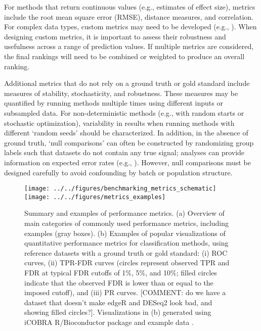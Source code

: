 \documentclass[12pt, a4paper]{article}
\begin{document}
For methods that return continuous values (e.g., estimates of effect size), metrics include the root mean square error (RMSE), distance measures, and correlation. For complex data types, custom metrics may need to be developed (e.g., \citep{Saelens2018b}). When designing custom metrics, it is important to assess their robustness and usefulness across a range of prediction values. If multiple metrics are considered, the final rankings will need to be combined or weighted to produce an overall ranking.

Additional metrics that do not rely on a ground truth or gold standard include measures of stability, stochasticity, and robustness. These measures may be quantified by running methods multiple times using different inputs or subsampled data. For non-deterministic methods (e.g., with random starts or stochastic optimization), variability in results when running methods with different `random seeds' should be characterized. In addition, in the absence of ground truth, `null comparisons' can often be constructed by randomizing group labels such that datasets do not contain any true signal; analyses can provide information on expected error rates (e.g., \citep{Weber2018, Law2014}). However, null comparisons must be designed carefully to avoid confounding by batch or population structure.





\vskip 5mm

\begin{figure}[H]
\begin{center}
\texttt{[image: ../../figures/benchmarking\_metrics\_schematic]}
\texttt{[image: ../../figures/metrics\_examples]}
\end{center}
\caption{Summary and examples of performance metrics. (a) Overview of main categories of commonly used performance metrics, including examples (gray boxes). (b) Examples of popular visualizations of quantitative performance metrics for classification methods, using reference datasets with a ground truth or gold standard: (i) ROC curves, (ii) TPR-FDR curves (circles represent observed TPR and FDR at typical FDR cutoffs of 1\%, 5\%, and 10\%; filled circles indicate that the observed FDR is lower than or equal to the imposed cutoff), and (iii) PR curves. [COMMENT: do we have a dataset that doesn't make edgeR and DESeq2 look bad, and showing filled circles?]. Visualizations in (b) generated using iCOBRA R/Bioconductor package and example data \citep{Soneson2016}.}
\label{fig:metrics}
\end{figure}
\end{document}
